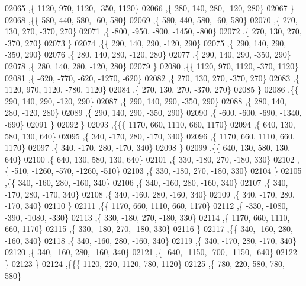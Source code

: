 \begin{DoxyCode}
02065     ,\{  1120,   970,  1120,  -350,  1120\}
02066     ,\{   280,   140,   280,  -120,   280\}
02067     \}
02068    ,\{\{   580,   440,   580,   -60,   580\}
02069     ,\{   580,   440,   580,   -60,   580\}
02070     ,\{   270,   130,   270,  -370,   270\}
02071     ,\{  -800,  -950,  -800, -1450,  -800\}
02072     ,\{   270,   130,   270,  -370,   270\}
02073     \}
02074    ,\{\{   290,   140,   290,  -120,   290\}
02075     ,\{   290,   140,   290,  -350,   290\}
02076     ,\{   280,   140,   280,  -120,   280\}
02077     ,\{   290,   140,   290,  -350,   290\}
02078     ,\{   280,   140,   280,  -120,   280\}
02079     \}
02080    ,\{\{  1120,   970,  1120,  -370,  1120\}
02081     ,\{  -620,  -770,  -620, -1270,  -620\}
02082     ,\{   270,   130,   270,  -370,   270\}
02083     ,\{  1120,   970,  1120,  -780,  1120\}
02084     ,\{   270,   130,   270,  -370,   270\}
02085     \}
02086    ,\{\{   290,   140,   290,  -120,   290\}
02087     ,\{   290,   140,   290,  -350,   290\}
02088     ,\{   280,   140,   280,  -120,   280\}
02089     ,\{   290,   140,   290,  -350,   290\}
02090     ,\{  -600,  -600,  -690, -1340,  -690\}
02091     \}
02092    \}
02093   ,\{\{\{  1170,   660,  1110,   660,  1170\}
02094     ,\{   640,   130,   580,   130,   640\}
02095     ,\{   340,  -170,   280,  -170,   340\}
02096     ,\{  1170,   660,  1110,   660,  1170\}
02097     ,\{   340,  -170,   280,  -170,   340\}
02098     \}
02099    ,\{\{   640,   130,   580,   130,   640\}
02100     ,\{   640,   130,   580,   130,   640\}
02101     ,\{   330,  -180,   270,  -180,   330\}
02102     ,\{  -510, -1260,  -570, -1260,  -510\}
02103     ,\{   330,  -180,   270,  -180,   330\}
02104     \}
02105    ,\{\{   340,  -160,   280,  -160,   340\}
02106     ,\{   340,  -160,   280,  -160,   340\}
02107     ,\{   340,  -170,   280,  -170,   340\}
02108     ,\{   340,  -160,   280,  -160,   340\}
02109     ,\{   340,  -170,   280,  -170,   340\}
02110     \}
02111    ,\{\{  1170,   660,  1110,   660,  1170\}
02112     ,\{  -330, -1080,  -390, -1080,  -330\}
02113     ,\{   330,  -180,   270,  -180,   330\}
02114     ,\{  1170,   660,  1110,   660,  1170\}
02115     ,\{   330,  -180,   270,  -180,   330\}
02116     \}
02117    ,\{\{   340,  -160,   280,  -160,   340\}
02118     ,\{   340,  -160,   280,  -160,   340\}
02119     ,\{   340,  -170,   280,  -170,   340\}
02120     ,\{   340,  -160,   280,  -160,   340\}
02121     ,\{  -640, -1150,  -700, -1150,  -640\}
02122     \}
02123    \}
02124   ,\{\{\{  1120,   220,  1120,   780,  1120\}
02125     ,\{   780,   220,   580,   780,   580\}

\end{DoxyCode}
